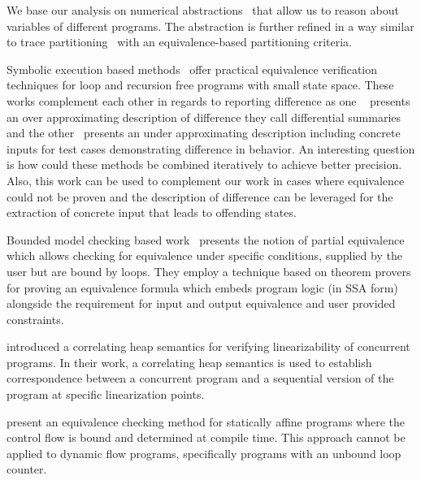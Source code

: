 We base our analysis on numerical abstractions~\cite{CousotHalbwachs78,Mine2006} that allow us to reason about variables of different programs. The abstraction is further refined in a way similar to trace partitioning~\cite{MauborgneRival07} with an equivalence-based partitioning criteria.

Symbolic execution based methods~\cite{DwyerElbaumPerson08,EnglerRamos11} offer practical equivalence verification techniques for loop and recursion free programs with small state space. These works complement each other in regards to reporting difference as one ~\cite{DwyerElbaumPerson08} presents an over approximating description of difference they call differential summaries and the other~\cite{EnglerRamos11} presents an under approximating description including concrete inputs for test cases demonstrating difference in behavior. An interesting question is how could these methods be combined iteratively to achieve better precision. Also, this work can be used to complement our work in cases where equivalence could not be proven and the description of difference can be leveraged for the extraction of concrete input that leads to offending states.

Bounded model checking based work~\cite{GodlinStrichman09} presents the notion of partial equivalence which allows checking for equivalence under specific conditions, supplied by the user but are bound by loops. They employ a technique based on theorem provers for proving an equivalence formula which embeds program logic (in SSA form) alongside the requirement for input and output equivalence and user provided constraints.

\cite{AmitRinetzkyRepsSagivYahav07} introduced a correlating heap semantics for verifying linearizability of concurrent programs. In their work, a correlating heap semantics is used to establish correspondence between a concurrent program and a sequential version of the program at specific linearization points.

\cite{BruynoogheJanssensVerdoolaege2009} present an equivalence checking method for statically affine programs where the control flow is bound and determined at compile time. This approach cannot be applied to dynamic flow programs, specifically programs with an unbound loop counter.
